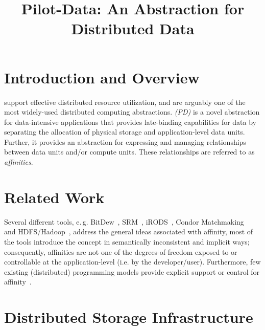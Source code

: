 \documentclass[conference]{IEEEtran}
\begin{document}

\title{Pilot-Data: An Abstraction for Distributed Data}

\author{}

\date{}
\maketitle

\begin{abstract} 


\end{abstract}

\section{Introduction and Overview} 

\pilotjobs support effective distributed resource utilization, and are
arguably one of the most widely-used distributed computing abstractions.
\emph{\pilotdata (PD)} is a novel abstraction for data-intensive applications
that provides late-binding capabilities for data by separating the allocation
of physical storage and application-level data units. Further, it provides an
abstraction for expressing and managing relationships between data units
and/or compute units. These relationships are referred to as
\emph{affinities}.


\section{Related Work}

Several different tools, e.\,g.
BitDew~\cite{Fedak:2008:BPE:1413370.1413416}, SRM~\cite{srm-ogf},
iRODS~\cite{Rajasekar:2010:IPI:1855046}, Condor
Matchmaking~\cite{Raman:1998:MDR:822083.823222} and
HDFS/Hadoop~\cite{hadoop}, address the general ideas associated with
affinity, most of the tools introduce the concept in semantically
inconsistent and implicit ways; consequently, affinities are not one
of the degrees-of-freedom exposed to or controllable at the
application-level (i.e.  by the developer/user). Furthermore, few
existing (distributed) programming models provide explicit support or
control for affinity~\cite{ideas}.


\section{Distributed Storage Infrastructure}
\end{document}
